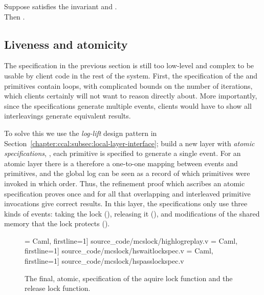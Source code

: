 \begin{theorem} 
Suppose  satisfies the invariant and
.\\
 Then .
\end{theorem}


\subsection{Liveness and atomicity}
\label{chapter:mcslock:sec:liveness-atomicity}

The specification in the previous section is still too low-level and
complex to be usable by client code in the rest of the system.  First,
the specification of the  and
 primitives contain loops, with complicated
bounds on the number of iterations, which clients certainly will not
want to reason directly about.  More importantly, since the
specifications generate multiple events, clients would have to show
all interleavings generate equivalent results.

To solve this we use the \textit{log-lift} design
pattern in Section~\ref{chapter:ccal:subsec:local-layer-interface}; build a new layer with \emph{atomic specifications},
\ie, each primitive is specified to generate  a single event.
For an atomic layer there is a
therefore a one-to-one mapping between events and primitives, and the global log
can be seen as a record of which primitives were invoked in which
order. Thus, the refinement proof which ascribes an atomic
specification proves once and for all that overlapping and interleaved
primitive invocations give correct results.
In this layer, the specifications only use three kinds 
of events: taking the lock (),
releasing it (), and modifications of the shared
memory that the lock protects ().



\begin{figure}
 = Caml, firstline=1] {source_code/mcslock/highlogreplay.v}
 = Caml, firstline=1] {source_code/mcslock/hswaitlockspec.v}
 = Caml, firstline=1] {source_code/mcslock/hspasslockspec.v}
\caption{The final, atomic, specification of the aquire lock function and the release lock function.}
\label{fig:chapter:mcslock:hswaitlockspec}
\end{figure}

